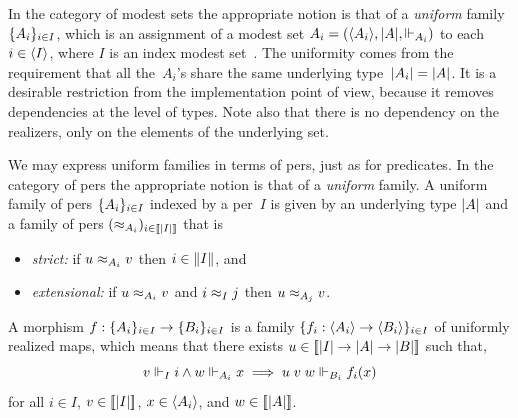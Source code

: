 \iflong
In the category of modest sets the appropriate notion is that of a
\emph{uniform} family~$\{A_i\}_{i \in I}$, which is an assignment
of a modest set $A_i = (\langle A_i \rangle, |A|, {\Vdash_{A_i}})$ to each
$i \in \langle I \rangle$, where $I$ is an index modest
set~\cite[6.3]{JacobsB:cltt}. The uniformity comes from the
requirement that all the~$A_i$'s share the same underlying
type~$|A_i| = |A|$. It is a desirable restriction from
the implementation point of view, because it removes dependencies at
the level of types. Note also that there is no dependency on the
realizers, only on the elements of the underlying set.

We may express uniform families in terms of pers, just as for
predicates.
\else
In the category of pers the appropriate notion is that of a
\emph{uniform} family.
%
\fi
A uniform family of pers $\{A_i\}_{i \in I}$ indexed
by a per~$I$ is given by an underlying type $|A|$ and a family
of pers $(\approx_{A_i})_{i \in [\![|I|]\!]}$ that is
% 
\begin{itemize}
\item \emph{strict:} if $u \approx_{A_i} v$ then $i \in \|I\|$, and
\item \emph{extensional:} if $u \approx_{A_i} v$ and $i \approx_I j$ then $u
  \approx_{A_j} v$.
\end{itemize}
%
\iflong
A morphism $f : \{A_i\}_{i \in I} \to \{B_i\}_{i \in I}$ is a
family $\{f_i : \langle A_i \rangle \to \langle B_i \rangle\}_{i \in I}$ of
uniformly realized maps, which means that there exists $u \in
[\![|I| \to |A| \to |B|]\!]$ such that,
%
\begin{equation*}
  v \Vdash_I i \land w \Vdash_{A_i} x \implies u\; v \; w \Vdash_{B_i} f_i(x)
\end{equation*}
%
for all $i \in I$, $v \in [\![|I|]\!]$, $x \in \langle A_i \rangle$,
and $w \in [\![|A|]\!]$.
%
\fi


